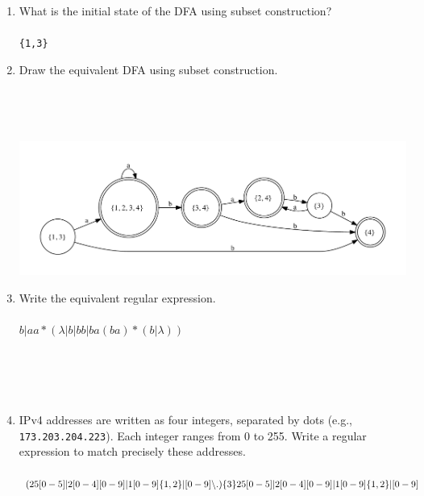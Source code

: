 \documentclass[10pt]{amsart}
\begin{document}
\begin{enumerate}
\item What is the initial state of the DFA using subset construction?\\\\\verb+{1,3}+
\item Draw the equivalent DFA using subset construction.\\\\\\\\\\
\includegraphics[width=5.4in]{midterm1key-figure}
\item Write the equivalent regular expression.\\\\
$b|aa*(\lambda|b|bb|ba(ba)*(b|\lambda))$
\\\\\\\\\\
\item IPv4 addresses are written as four integers, separated by dots (e.g., \verb+173.203.204.223+). Each integer ranges from 0 to 255. Write a regular expression to match precisely these addresses.\\\\
$(25[0-5]|2[0-4][0-9]|1[0-9]\{1,2\}|[0-9]\char`\\.)\{3\}25[0-5]|2[0-4][0-9]|1[0-9]\{1,2\}|[0-9]$
\end{enumerate}
\end{document}

